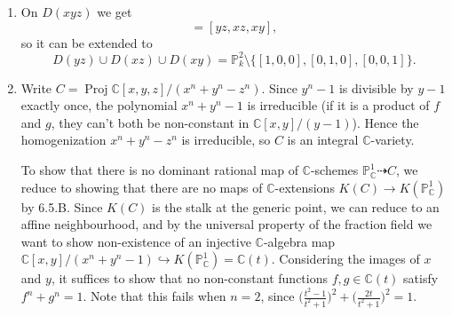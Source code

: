 \documentclass{report}
\renewcommand{\P}{\mathbb{P}} %
\newcommand{\C}{\mathbb{C}}
\DeclareMathOperator{\Proj}{Proj}
\begin{document}
\begin{enumerate}[label=\textbf{6.5.\Alph*.}]
	\item On $D(xyz)$ we get
	      \begin{equation*}
		      [1/x,1/y,1/z]=[yz,xz,xy],
	      \end{equation*}
	      so it can be extended to
	      \begin{equation*}
		      D(yz)\cup D(xz)\cup D(xy)
		      = \P^2_k\setminus\{[1,0,0],[0,1,0],[0,0,1]\}.
	      \end{equation*}

	\item Write $C=\Proj\C[x,y,z]/(x^n+y^n-z^n)$. Since $y^n-1$ is divisible
	      by $y-1$ exactly once, the polynomial $x^n+y^n-1$ is irreducible (if
	      it is a product of $f$ and $g$, they can't both be non-constant in
	      $\C[x,y]/(y-1)$). Hence the homogenization $x^n+y^n-z^n$ is
	      irreducible, so $C$ is an integral $\C$-variety.

	      To show that there is no dominant rational map of $\C$-schemes
	      $\P^1_\C\dashrightarrow C$, we reduce to showing that there are no
	      maps of $\C$-extensions $K(C)\to K(\P^1_\C)$ by 6.5.B. Since $K(C)$ is
	      the stalk at the generic point, we can reduce to an affine
	      neighbourhood, and by the universal property of the fraction field we
	      want to show non-existence of an injective $\C$-algebra map
	      $\C[x,y]/(x^n+y^n-1)\hookrightarrow K(\P^1_\C)=\C(t)$. Considering the
	      images of $x$ and $y$, it suffices to show that no non-constant
	      functions $f,g\in\C(t)$ satisfy $f^n+g^n=1$. Note that this fails when
	      $n=2$, since $\bigl(\frac{t^2-1}{t^2+1}\bigr)^2+\bigl(\frac{2t}{t^2+1}\bigr)^2=1$.


\end{enumerate}
\end{document}
